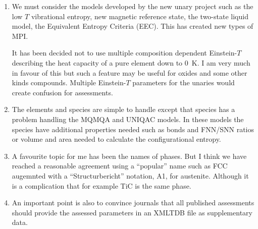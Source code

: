 \documentclass[12pt]{article}
\begin{document}
\begin{enumerate}
\item We must consider the models developed by the new unary project
  such as the low $T$ vibrational entropy, new magnetic reference
  state, the two-state liquid model, the Equivalent Entropy Criteria
  (EEC).  This has created new types of MPI.

  It has been decided not to use multiple composition dependent
  Einstein-$T$ describing the heat capacity of a pure element down to
  0~K.  I am very much in favour of this but such a feature may be
  useful for oxides and some other kinds compounds.  Multiple
  Einstein-$T$ parameters for the unaries would create confusion for
  assessments.
  
\item The elements and species are simple to handle except that
  species has a problem handling the MQMQA and UNIQAC models.  In
  these models the species have additional properties needed such as
  bonds and FNN/SNN ratios or volume and area needed to calculate the
  configurational entropy.

\item A favourite topic for me has been the names of phases.  But I
  think we have reached a reasonable agreement using a ``popular''
  name such as FCC augemnted with a ``Structurbericht'' notation, A1,
  for austenite.  Although it is a complication that for example TiC
  is the same phase.

\item An important point is also to convince journals that all
  published assessments should provide the assessed parameters in an
  XMLTDB file as supplementary data.

\end{enumerate}
\end{document}
